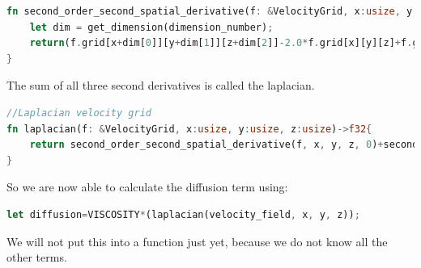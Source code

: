 \documentclass{article}
\begin{document}
\begin{lstlisting}[language=Rust, style=boxed, breaklines=true]
fn second_order_second_spatial_derivative(f: &VelocityGrid, x:usize, y:usize, z:usize, dimension_number:usize) -> f32{
    let dim = get_dimension(dimension_number);
    return(f.grid[x+dim[0]][y+dim[1]][z+dim[2]]-2.0*f.grid[x][y][z]+f.grid[x-dim[0]][y-dim[1]][z-dim[2]])/(GRIDELEMENTSCALE*GRIDELEMENTSCALE);
}
\end{lstlisting}
The sum of all three second derivatives is called the laplacian. \cite{MAC}
\begin{lstlisting}[language=Rust, style=boxed, breaklines=true]
//Laplacian velocity grid
fn laplacian(f: &VelocityGrid, x:usize, y:usize, z:usize)->f32{
    return second_order_second_spatial_derivative(f, x, y, z, 0)+second_order_second_spatial_derivative(f, x, y, z, 1)+second_order_second_spatial_derivative(f, x, y, z, 2);
}
\end{lstlisting}
So we are now able to calculate the diffusion term using:
\begin{lstlisting}[language=Rust, style=boxed, breaklines=true]
let diffusion=VISCOSITY*(laplacian(velocity_field, x, y, z));
\end{lstlisting}
We will not put this into a function just yet, because we do not know all the other terms. 
\newpage
\end{document}
